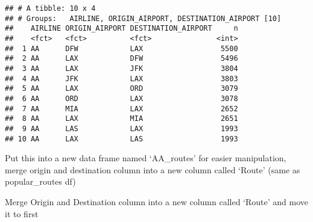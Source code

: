 \documentclass[]{article}
\newenvironment{Shaded}{\begin{snugshade}}{\end{snugshade}}
\newcommand{\DecValTok}[1]{\textcolor[rgb]{0.00,0.00,0.81}{#1}}
\newcommand{\KeywordTok}[1]{\textcolor[rgb]{0.13,0.29,0.53}{\textbf{#1}}}
\newcommand{\NormalTok}[1]{#1}
\newcommand{\OperatorTok}[1]{\textcolor[rgb]{0.81,0.36,0.00}{\textbf{#1}}}
\newcommand{\OtherTok}[1]{\textcolor[rgb]{0.56,0.35,0.01}{#1}}
\newcommand{\StringTok}[1]{\textcolor[rgb]{0.31,0.60,0.02}{#1}}
\begin{document}
\begin{verbatim}
## # A tibble: 10 x 4
## # Groups:   AIRLINE, ORIGIN_AIRPORT, DESTINATION_AIRPORT [10]
##    AIRLINE ORIGIN_AIRPORT DESTINATION_AIRPORT     n
##    <fct>   <fct>          <fct>               <int>
##  1 AA      DFW            LAX                  5500
##  2 AA      LAX            DFW                  5496
##  3 AA      LAX            JFK                  3804
##  4 AA      JFK            LAX                  3803
##  5 AA      LAX            ORD                  3079
##  6 AA      ORD            LAX                  3078
##  7 AA      MIA            LAX                  2652
##  8 AA      LAX            MIA                  2651
##  9 AA      LAS            LAX                  1993
## 10 AA      LAX            LAS                  1993
\end{verbatim}

Put this into a new data frame named `AA\_routes' for easier
manipulation, merge origin and destination column into a new column
called `Route' (same as popular\_routes df)

\begin{Shaded}
\end{Shaded}

Merge Origin and Destination column into a new column called `Route' and
move it to first

\begin{Shaded}
\end{Shaded}
\end{document}
